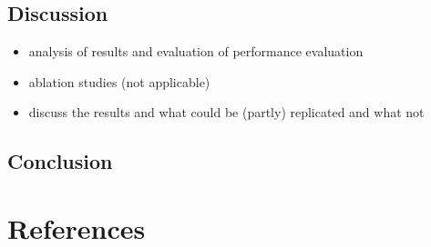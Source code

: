 \documentclass[
  english,
  man,floatsintext]{apa6}
\providecommand{\tightlist}{%
  \setlength{\itemsep}{0pt}\setlength{\parskip}{0pt}}
\begin{document}
\hypertarget{discussion}{%
\subsection{Discussion}\label{discussion}}

\begin{itemize}
\tightlist
\item
  analysis of results and evaluation of performance evaluation
\item
  ablation studies (not applicable)
\item
  discuss the results and what could be (partly) replicated and what not
\end{itemize}

\hypertarget{conclusion}{%
\subsection{Conclusion}\label{conclusion}}

\newpage

\hypertarget{references}{%
\section{References}\label{references}}

\begingroup
\setlength{\parindent}{-0.5in}
\setlength{\leftskip}{0.5in}
\end{document}
